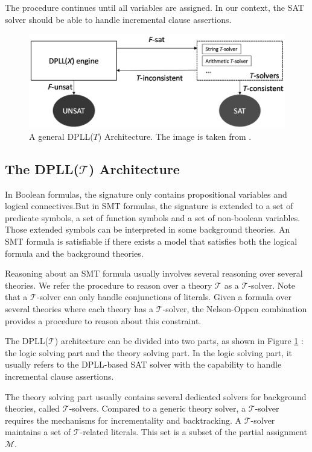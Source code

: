 The procedure continues until all variables are assigned. In our context, the SAT solver should be able to handle incremental clause assertions. 

\begin{figure}[htb]
	\begin{center}
		\includegraphics[width=0.8\linewidth]{pictures/dpll_arc.png}
	\end{center}
	\caption{A general DPLL(\(T\)) Architecture. The image is taken from \cite{main_phd}.}
	\label{fig:dpll_architecture}
\end{figure}

\subsection{The DPLL($\mathcal{T}$) Architecture}
\label{sec:The DPLL(T) Architecture}
In Boolean formulas, the signature only contains propositional variables and logical connectives.But in SMT formulas, the signature is extended to a set of predicate symbols, a set of function symbols and a set of non-boolean variables. Those extended symbols can be interpreted in some background theories. An SMT formula is satisfiable if there exists a model that satisfies both the logical formula and the background theories.

Reasoning about an SMT formula usually involves several reasoning over several theories. We refer the procedure to reason over a theory $\mathcal{T}$ as a $\mathcal{T}$-solver. Note that a $\mathcal{T}$-solver can only handle conjunctions of literals. Given a formula over several theories where each theory has a $\mathcal{T}$-solver, the Nelson-Oppen combination \cite{nelson_oppen} provides a procedure to reason about this constraint.

The DPLL($\mathcal{T}$) architecture can be divided into two parts, as shown in Figure \ref{fig:dpll_architecture} : the logic solving part and the theory solving part. In the logic solving part, it usually refers to the DPLL-based SAT solver with  the capability to handle incremental clause assertions. 

The theory solving part usually contains several dedicated solvers for background theories, called $\mathcal{T}$-solvers. Compared to a generic theory solver, a $\mathcal{T}$-solver requires the mechanisms for incrementality and backtracking. A $\mathcal{T}$-solver maintains a set of $\mathcal{T}$-related literals. This set is a subset of the partial assignment $\mathcal{M}$.

